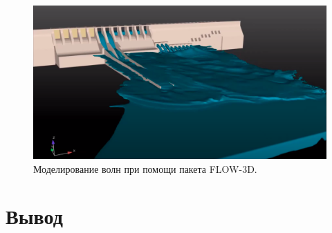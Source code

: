 \begin{figure}[H]
	\begin{center}
		\includegraphics[scale=0.2]{img/flow-3d.png}
	\end{center}
	\captionsetup{justification=centering}
	\caption{Моделирование волн при помощи пакета FLOW-3D.}
	\label{img:flow-3d}
\end{figure}

\section*{Вывод}
